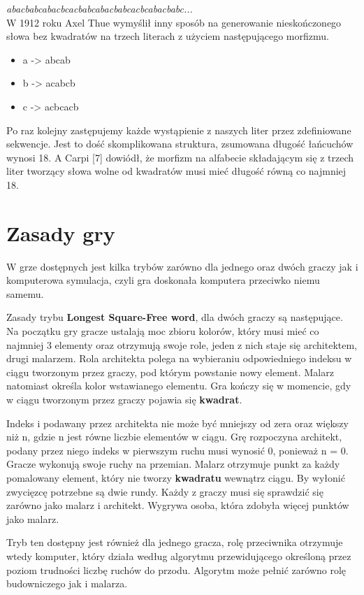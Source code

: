\documentclass[document]{xmgr}
\begin{document}
\emph{abacbabcabacbcacbabcabacbabcacbcabacbabc...}\\

W 1912 roku Axel Thue wymyślił inny sposób na generowanie nieskończonego słowa bez kwadratów na trzech literach z użyciem następującego morfizmu. 
\begin{itemize}
\item a -> abcab
\item b -> acabcb
\item c -> acbcacb
\end{itemize}


Po raz kolejny zastępujemy każde wystąpienie z naszych liter przez zdefiniowane sekwencje. Jest to dość skomplikowana struktura, zsumowana długość łańcuchów wynosi 18. A Carpi [7] dowiódł, że morfizm na alfabecie składającym się z trzech liter tworzący słowa wolne od kwadratów musi mieć długość równą co najmniej 18.


\section{Zasady gry}

W grze dostępnych jest kilka trybów zarówno dla jednego oraz dwóch graczy jak i komputerowa symulacja, czyli gra doskonała komputera przeciwko niemu samemu.

Zasady trybu \textbf{Longest Square-Free word}, dla dwóch graczy są następujące.
Na początku gry gracze ustalają moc zbioru kolorów, który musi mieć co najmniej 3 elementy oraz otrzymują swoje role, jeden z nich staje się architektem, drugi malarzem. Rola architekta polega na wybieraniu odpowiedniego indeksu w ciągu tworzonym przez graczy, pod którym powstanie nowy element. Malarz natomiast określa kolor wstawianego elementu. Gra kończy się w momencie, gdy w ciągu tworzonym przez graczy pojawia się \textbf{kwadrat}. 

Indeks i  podawany przez architekta nie może być mniejszy od zera oraz większy niż n, gdzie n jest równe liczbie elementów w ciągu.
Grę rozpoczyna architekt, podany przez niego indeks w pierwszym ruchu musi wynosić 0, ponieważ n = 0. Gracze wykonują swoje ruchy na przemian. Malarz otrzymuje punkt za każdy pomalowany element, który nie tworzy \textbf{kwadratu} wewnątrz ciągu.
By wyłonić zwycięzcę potrzebne są dwie rundy. Każdy z graczy musi się sprawdzić się zarówno jako malarz i architekt. Wygrywa osoba, która zdobyła więcej punktów jako malarz.

Tryb ten dostępny jest również dla jednego gracza, rolę przeciwnika otrzymuje wtedy komputer, który działa według algorytmu przewidującego określoną przez poziom trudności liczbę ruchów do przodu. Algorytm może pełnić zarówno rolę budowniczego jak i malarza.
\end{document}
